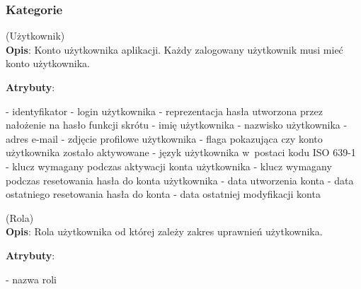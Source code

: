 \subsubsection{Kategorie}\label{subsubsec:database:gateway:categories}

\begin{enumerate}[label={\textbf{KAT/1/\protect\twodigits{\theenumi}}}, wide, labelwidth=!, labelindent=0pt, labelsep=0pt, series=reqs]
    \setlength\itemsep{1.75em}
    \label{kat:User} (Użytkownik)\\
    \indent\textbf{Opis}: Konto użytkownika aplikacji. Każdy zalogowany użytkownik musi mieć konto użytkownika.
    \par
    \textbf{Atrybuty}:
    \begin{itemize}[series=atr, wide, align=left, leftmargin=190pt]
        \label{kat:User:id}- identyfikator
        \label{kat:User:login}- login użytkownika
        \label{kat:User:passwordHash}- reprezentacja hasła utworzona przez nałożenie na hasło funkcji skrótu
        \label{kat:User:firstName}- imię użytkownika
        \label{kat:User:lastName}- nazwisko użytkownika
        \label{kat:User:email}- adres e-mail
        \label{kat:User:image}- zdjęcie profilowe użytkownika
        \label{kat:User:activated}- flaga pokazująca czy konto użytkownika zostało aktywowane
        \label{kat:User:language}- język użytkownika w~postaci kodu ISO 639-1
        \label{kat:User:activationKey}- klucz wymagany podczas aktywacji konta użytkownika
        \label{kat:User:resetKey}- klucz wymagany podczas resetowania hasła do konta użytkownika
        \label{kat:User:createdDate}- data utworzenia konta
        \label{kat:User:resetDate}- data ostatniego resetowania hasła do konta
        \label{kat:User:lastModifiedDate}- data ostatniej modyfikacji konta
    \end{itemize}

    \label{kat:Authority} (Rola)\\
    \indent\textbf{Opis}: Rola użytkownika od której zależy zakres uprawnień użytkownika.
    \par
    \textbf{Atrybuty}:
    \begin{itemize}[series=atr, wide, align=left, leftmargin=190pt]
        \label{kat:Authority:name}- nazwa roli
    \end{itemize}


\end{enumerate}
